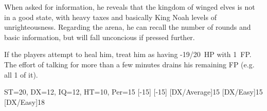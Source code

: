 \documentclass[twocolumn]{memoir}
\begin{document}
When asked for information, he reveals that the kingdom of winged elves is not in a good state, with heavy taxes and basically King Noah levels of unrighteousness. Regarding the arena, he can recall the number of rounds and basic information, but will fall unconcious if pressed further.

If the players attempt to heal him, treat him as having -19/20~HP with 1~FP. The effort of talking for more than a few minutes drains his remaining FP (e.g. all 1 of it).

\begin{character}{ST=20, DX=12, IQ=12, HT=10, Per=15}
  [-15]
  [-15]
  [DX/Average]{15}
  [DX/Easy]{15}
  [DX/Easy]{18}
\end{character}
\end{document}

